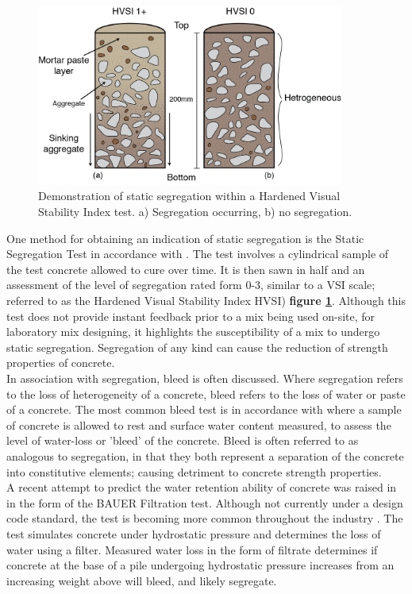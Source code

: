 \\
\\
\begin{figure}[H]
\centering
\includegraphics[width=0.9\textwidth]{hvsi.png}
\caption{\label{fig:hvsi} Demonstration of static segregation within a Hardened Visual Stability Index test. a) Segregation occurring, b) no segregation.}
\end{figure}
\noindent
One method for obtaining an indication of static segregation is the Static Segregation Test in accordance with \citeauthor{HVSI}. The test involves a cylindrical sample of the test concrete allowed to cure over time. It is then sawn in half and an assessment of the level of segregation rated form 0-3, similar to a VSI scale; referred to as the Hardened Visual Stability Index HVSI) {\bfseries figure \ref{fig:hvsi}}. Although this test does not provide instant feedback prior to a mix being used on-site, for laboratory mix designing, it highlights the susceptibility of a mix to undergo static segregation. Segregation of any kind can cause the reduction of strength properties of concrete.\\
\newline
\noindent
In association with segregation, bleed is often discussed. Where segregation refers to the loss of heterogeneity of a concrete, bleed refers to the loss of water or paste of a concrete. The most common bleed test is in accordance with \citeauthor{ASTMbleed} where a sample of concrete is allowed to rest and surface water content measured, to assess the level of water-loss or 'bleed' of the concrete. Bleed is often referred to as analogous to segregation, in that they both represent a separation of the concrete into constitutive elements; causing detriment to concrete strength properties.\\
\newline
\noindent
A recent attempt to predict the water retention ability of concrete was raised in \citet{CIA} in the form of the BAUER Filtration test. Although not currently under a design code standard, the test is becoming more common throughout the industry \cite{Sperwall}. The test simulates concrete under hydrostatic pressure and determines the loss of water using a filter. Measured water loss in the form of filtrate determines if concrete at the base of a pile undergoing hydrostatic pressure increases from an increasing weight above will bleed, and likely segregate.\\
